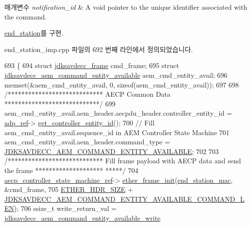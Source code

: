 \begin{DoxyParams}{매개변수}
{\em notification\+\_\+id} & A void pointer to the unique identifier associated with the command. \\
\hline
\end{DoxyParams}


\hyperlink{classavdecc__lib_1_1end__station_a61f474caee9197db7d0913f5ff49dd92}{end\+\_\+station}를 구현.



end\+\_\+station\+\_\+imp.\+cpp 파일의 692 번째 라인에서 정의되었습니다.


\begin{DoxyCode}
693 \{
694     \textcolor{keyword}{struct }\hyperlink{structjdksavdecc__frame}{jdksavdecc\_frame} cmd\_frame;
695     \textcolor{keyword}{struct }\hyperlink{structjdksavdecc__aem__command__entity__available}{jdksavdecc\_aem\_command\_entity\_available} 
      aem\_cmd\_entity\_avail;
696     memset(&aem\_cmd\_entity\_avail, 0, \textcolor{keyword}{sizeof}(aem\_cmd\_entity\_avail));
697 
698     \textcolor{comment}{/**************************** AECP Common Data ****************************/}
699     aem\_cmd\_entity\_avail.aem\_header.aecpdu\_header.controller\_entity\_id = \hyperlink{classavdecc__lib_1_1end__station__imp_a0b7b5ce956637a18c695ba20f2d4908c}{adp\_ref}->
      \hyperlink{classavdecc__lib_1_1adp_a0c0959a46658c0a22e9530334b2912da}{get\_controller\_entity\_id}();
700     \textcolor{comment}{// Fill aem\_cmd\_entity\_avail.sequence\_id in AEM Controller State Machine}
701     aem\_cmd\_entity\_avail.aem\_header.command\_type = 
      \hyperlink{group__command_ga9fd008c3de503ebf99111e4464e3142d}{JDKSAVDECC\_AEM\_COMMAND\_ENTITY\_AVAILABLE};
702 
703     \textcolor{comment}{/**************************** Fill frame payload with AECP data and send the frame ********************
      *****/}
704     \hyperlink{namespaceavdecc__lib_a0b1b5aea3c0490f77cbfd9178af5be22}{aecp\_controller\_state\_machine\_ref}->
      \hyperlink{classavdecc__lib_1_1aecp__controller__state__machine_a86ff947c5e6b799cfb877d3767bfa1f9}{ether\_frame\_init}(\hyperlink{classavdecc__lib_1_1end__station__imp_a0e9fa7b31d903107ff9e7aac9dac172d}{end\_station\_mac}, &cmd\_frame,
705                                                         \hyperlink{namespaceavdecc__lib_a6c827b1a0d973e18119c5e3da518e65ca9512ad9b34302ba7048d88197e0a2dc0}{ETHER\_HDR\_SIZE} + 
      \hyperlink{group__command__entity__available_ga30ae597e2bbf5439d01764cc00618fd7}{JDKSAVDECC\_AEM\_COMMAND\_ENTITY\_AVAILABLE\_COMMAND\_LEN});
706     ssize\_t write\_return\_val = \hyperlink{group__command__entity__available_gaa12d3055d62b15ce98d231278ab54288}{jdksavdecc\_aem\_command\_entity\_available\_write}

\end{DoxyCode}
